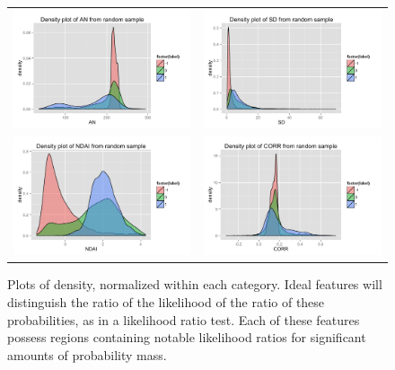 \documentclass[english]{article}\usepackage{graphicx, color}
\numberwithin{equation}{section}
\numberwithin{figure}{section}
\begin{document}
\begin{figure}[!h]
\begin{tabular}{cc}
  \includegraphics[width=80mm]{../figures/density-AN.png} &
  \includegraphics[width=80mm]{../figures/density-SD.png}  \\
  \includegraphics[width=80mm]{../figures/density-NDAI.png} &
  \includegraphics[width=80mm]{../figures/density-CORR.png}  \\
\end{tabular}
\caption{Plots of density, normalized within each category. Ideal features will 
	distinguish the ratio of the likelihood of the ratio of these probabilities, as in 
	a likelihood ratio test. Each of these features possess regions containing 
	notable likelihood ratios for significant amounts of probability mass.}
\end{figure}
\end{document}
